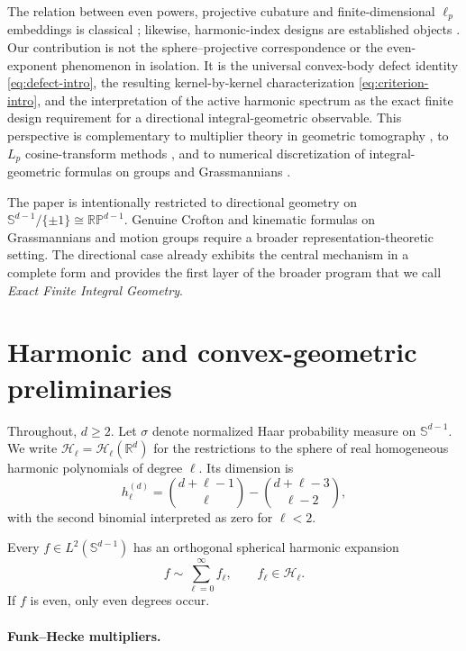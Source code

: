 \documentclass[12pt,a4paper]{article}
\newcommand{\Sph}{\mathbb S}
\newcommand{\RP}{\mathbb{RP}}
\newcommand{\R}{\mathbb R}
\newcommand{\Harm}{\mathcal H}
\theoremstyle{plain}
\theoremstyle{definition}
\begin{document}
The relation between even powers, projective cubature and finite-dimensional $\ell_p$ embeddings is classical \cite{LyubichVaserstein,Lyubich2009,Lindblad}; likewise, harmonic-index designs are established objects \cite{BOT,ZhuEtAl}. Our contribution is not the sphere--projective correspondence or the even-exponent phenomenon in isolation. It is the universal convex-body defect identity \eqref{eq:defect-intro}, the resulting kernel-by-kernel characterization \eqref{eq:criterion-intro}, and the interpretation of the active harmonic spectrum as the exact finite design requirement for a directional integral-geometric observable. This perspective is complementary to multiplier theory in geometric tomography \cite{Gardner,Kiderlen,GYY}, to $L_p$ cosine-transform methods \cite{LiXiZhang}, and to numerical discretization of integral-geometric formulas on groups and Grassmannians \cite{Pausinger,PausingerSvane}.

The paper is intentionally restricted to directional geometry on $\Sph^{d-1}/\{\pm1\}\cong\RP^{d-1}$. Genuine Crofton and kinematic formulas on Grassmannians and motion groups require a broader representation-theoretic setting. The directional case already exhibits the central mechanism in a complete form and provides the first layer of the broader program that we call \emph{Exact Finite Integral Geometry}.

\section{Harmonic and convex-geometric preliminaries}

Throughout, $d\ge2$.  Let $\sigma$ denote normalized Haar probability measure on $\Sph^{d-1}$.  We write $\Harm_\ell=\Harm_\ell(\R^d)$ for the restrictions to the sphere of real homogeneous harmonic polynomials of degree $\ell$.  Its dimension is
\begin{equation}\label{eq:dim-harm}
 h_\ell^{(d)}
 =\binom{d+\ell-1}{\ell}-\binom{d+\ell-3}{\ell-2},
\end{equation}
with the second binomial interpreted as zero for $\ell<2$.

Every $f\in L^2(\Sph^{d-1})$ has an orthogonal spherical harmonic expansion
\[
 f\sim\sum_{\ell=0}^\infty f_\ell,
 \qquad f_\ell\in\Harm_\ell.
\]
If $f$ is even, only even degrees occur.

\paragraph{Funk--Hecke multipliers.}
\end{document}
